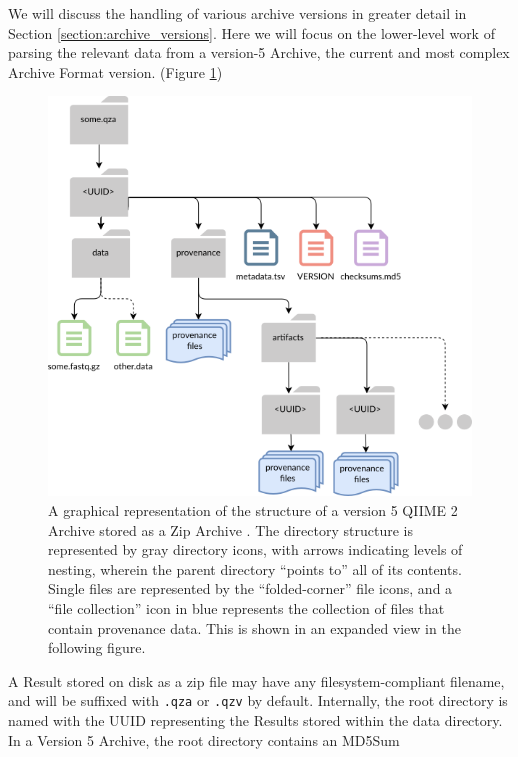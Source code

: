 We will discuss the handling of various archive versions in greater detail
in Section \ref{section:archive_versions}. Here we will focus on the lower-level work of parsing the relevant data
from a version-5 Archive, the current and most complex Archive Format version.
(Figure \ref{fig:archive_structure})

\begin{figure}[htbp]
\centering
\includegraphics[width=\textwidth]{figures/archive_structure.png}
\caption[Diagram of the structure of a version-5 QIIME 2 Archive]%
{A graphical representation of the structure of a version 5 QIIME 2 Archive
stored as a Zip Archive \parencite{qiime_2_development_team_archive_2018}.
The directory structure is represented by gray
directory icons, with arrows indicating levels of nesting, wherein the parent
directory “points to” all of its contents. Single files are represented by the
“folded-corner” file icons, and a “file collection” icon in blue represents the
collection of files that contain provenance data. This is shown in an expanded
view in the following figure.}
\label{fig:archive_structure}
\end{figure}
A Result stored on disk as a zip file may have any filesystem-compliant
filename, and will be suffixed with \texttt{.qza} or \texttt{.qzv} by default. Internally, the
root directory is named with the UUID representing the Results stored within the
data directory. In a Version 5 Archive, the root directory contains an MD5Sum
